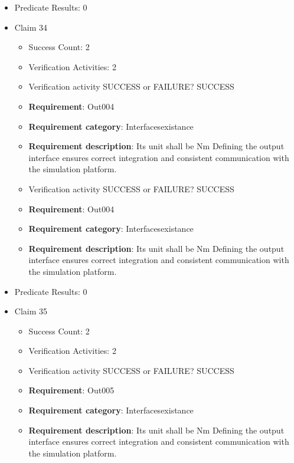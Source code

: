 \documentclass{article}
\begin{document}
\begin{itemize}
\begin{itemize}
				\end{itemize}
				
									    
				\item Predicate Results: 0

  				  \item Claim 34
				\begin{itemize}
			    	\item Success Count: 2 
			    	\item Verification Activities: 2
					\item Verification activity SUCCESS or FAILURE? SUCCESS
		
						\item \textbf{Requirement}: Out004 
						\item \textbf{Requirement category}: Interfacesexistance 
						\item \textbf{Requirement description}: Its unit shall be Nm Defining the output interface ensures correct integration and consistent communication with the simulation platform.
					
					\item Verification activity SUCCESS or FAILURE? SUCCESS
		
						\item \textbf{Requirement}: Out004 
						\item \textbf{Requirement category}: Interfacesexistance 
						\item \textbf{Requirement description}: Its unit shall be Nm Defining the output interface ensures correct integration and consistent communication with the simulation platform.
					
				\end{itemize}
				
									    
				\item Predicate Results: 0

  				  \item Claim 35
				\begin{itemize}
			    	\item Success Count: 2 
			    	\item Verification Activities: 2
					\item Verification activity SUCCESS or FAILURE? SUCCESS
		
						\item \textbf{Requirement}: Out005 
						\item \textbf{Requirement category}: Interfacesexistance 
						\item \textbf{Requirement description}: Its unit shall be Nm Defining the output interface ensures correct integration and consistent communication with the simulation platform.
					

\end{itemize}
\end{itemize}
\end{document}
